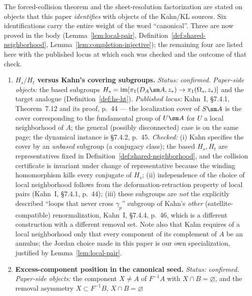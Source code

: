 \begin{remark}\label{rem:exact-identification-checklist}
The forced-collision theorem and the sheet-resolution factorization are
stated on objects that this paper \emph{identifies} with objects of
the Kahn/KL sources.  Six identifications carry the entire
weight of the word ``canonical''.  Three are now proved in the body
(Lemma~\ref{lem:local-pair},
Definition~\ref{def:shared-neighborhood},
Lemma~\ref{lem:completion-injective}); the remaining four are listed
here with the published locus at which each was checked and the
outcome of that check.
\begin{enumerate}
\item \textbf{\(H_s/H_t\) versus Kahn's covering subgroups.}
\emph{Status: confirmed.}
\emph{Paper-side objects:} the based subgroups
\(H_s=\operatorname{im}[\pi_1(D_A\sm A,z_*)\to\pi_1(\Omega_s,z_*)]\)
and the target analogue (Definition~\ref{def:hs-ht}).
\emph{Published locus:} Kahn~I, \S7.4.1, Theorem~7.12 and its proof,
p.~44 --- the localization cover of \(S\sm A\) is the cover
corresponding to the fundamental group of \(U\sm A\) for \(U\) a local
neighborhood of \(A\); the general (possibly disconnected) case is on
the same page; the dynamical instance is \S7.4.2, p.~45.
\emph{Checked:} (i) Kahn specifies the cover by an \emph{unbased}
subgroup (a conjugacy class); the based \(H_s,H_t\) are representatives
fixed in Definition~\ref{def:shared-neighborhood}, and the collision
certificate is invariant under change of representative because the
winding homomorphism kills every conjugate of \(H_s\); (ii)
independence of the choice of local neighborhood follows from the
deformation-retraction property of local pairs (Kahn~I, \S7.4.1,
p.~44); (iii) these subgroups are \emph{not} the explicitly described
``loops that never cross \(\gamma_p\)'' subgroup of Kahn's
\emph{other} (satellite-compatible) renormalization, Kahn~I, \S7.4.4,
p.~46, which is a different construction with a different removal set.
Note also that Kahn requires of a local neighborhood only that every
component of its complement of \(A\) be an annulus; the Jordan choice
made in this paper is our own specialization, justified by
Lemma~\ref{lem:local-pair}.
\item \textbf{Excess-component position in the canonical seed.}
\emph{Status: confirmed.}
\emph{Paper-side objects:} the component \(X\ne A\) of \(F^{-1}A\)
with \(X\cap B=\varnothing\), and the removal asymmetry
\(X\subset F^{-1}B\), \(X\cap B=\varnothing\)

\end{enumerate}
\end{remark}
